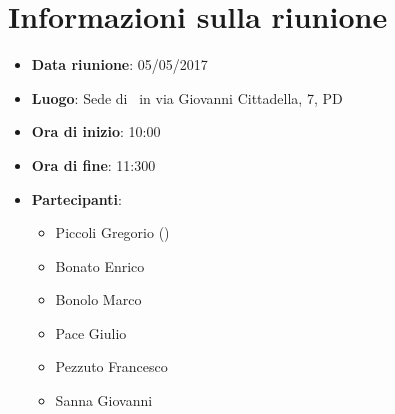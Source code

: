 \documentclass[../AnalisiDeiRequisiti.tex]{subfiles}
\begin{document}
	\section*{Informazioni sulla riunione}
		\begin{itemize}
			\item \textbf{Data riunione}: 05/05/2017
			\item \textbf{Luogo}: Sede di \proponente\ in via Giovanni Cittadella, 7, PD
			\item \textbf{Ora di inizio}: 10:00
			\item \textbf{Ora di fine}: 11:300
			\item \textbf{Partecipanti}:
				\begin{itemize}
					\item Piccoli Gregorio (\proponente)
					\item Bonato Enrico
					\item Bonolo Marco
					\item Pace Giulio
					\item Pezzuto Francesco
					\item Sanna Giovanni
				\end{itemize}
		\end{itemize}
\end{document}
